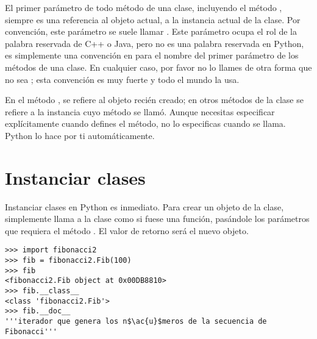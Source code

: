 El primer parámetro de todo método de una clase, incluyendo el método , siempre es una referencia al objeto actual, a la instancia actual de la clase. Por convención, este parámetro se suele llamar . Este parámetro ocupa el rol de la palabra reservada  de C++ o Java, pero  no es una palabra reservada en Python, es simplemente una convención en para el nombre del primer parámetro de los métodos de una clase. En cualquier caso, por favor no lo llames de otra forma que no sea ; esta convención es muy fuerte y todo el mundo la usa.

En el método ,  se refiere al objeto recién creado; en otros métodos de la clase se refiere a la instancia cuyo método se llamó. Aunque necesitas especificar  explícitamente cuando defines el método, no lo especificas cuando se llama. Python lo hace por ti automáticamente.

\section{Instanciar clases}

Instanciar clases en Python es inmediato. Para crear un objeto de la clase, simplemente llama a la clase como si fuese una función, pasándole los parámetros que requiera el método . El valor de retorno será el nuevo objeto.

\noindent\begin{minipage}{\textwidth}
\begin{lstlisting}[mathescape=True]
>>> import fibonacci2 
>>> fib = fibonacci2.Fib(100)
>>> fib
<fibonacci2.Fib object at 0x00DB8810>
>>> fib.__class__
<class 'fibonacci2.Fib'>
>>> fib.__doc__
'''iterador que genera los n$\ac{u}$meros de la secuencia de Fibonacci'''
\end{lstlisting}
\end{minipage}

